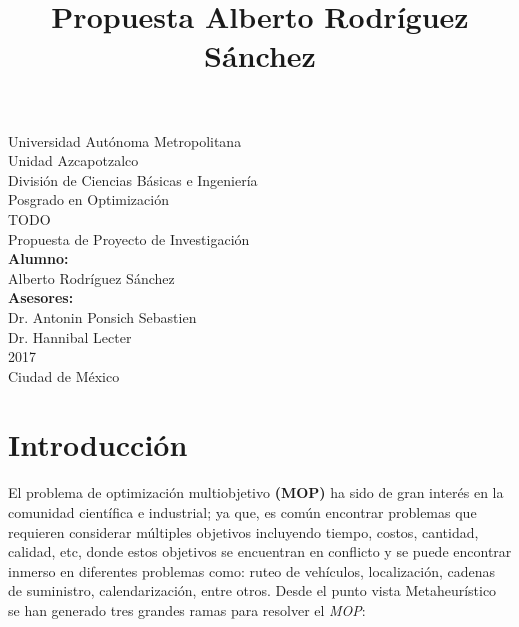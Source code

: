 \documentclass[letterpaper,10pt]{article}
\title{Propuesta Alberto Rodríguez Sánchez}
\begin{document}
\renewcommand{\refname}{Bibliografía}%
\thispagestyle{empty}

\begin{center}
    {\Huge Universidad Autónoma Metropolitana }\\
    {\huge Unidad Azcapotzalco}\\
    \vspace{0.5cm}
    {\Large División de Ciencias Básicas e Ingeniería}\\
    \vspace{1.0cm}
    {\large Posgrado en Optimización}\\
    \vspace{2.0cm}    
    {\Large TODO}\\
    \vspace{1.0cm}
    {\large Propuesta de Proyecto de Investigación}\\
    \vspace{2.0cm}
    {\large\textbf{Alumno:}}\\
    Alberto Rodríguez Sánchez\\
    \vspace{1.5cm}
    \bigskip
    {\large\textbf{Asesores:}}\\
    Dr. Antonin Ponsich Sebastien\\
    Dr. Hannibal Lecter\\
    \vspace{1.5cm}
     2017\\
    \vspace{1.0cm}
    Ciudad de México\\
\end{center}
\newpage
\tableofcontents
\newpage
\section{Introducción}

El problema de optimización multiobjetivo \textbf{(MOP)} ha sido de gran interés en la comunidad científica e industrial; ya que, es común encontrar problemas que requieren considerar múltiples objetivos incluyendo tiempo, costos, cantidad, calidad, etc, donde estos objetivos se encuentran en conflicto y se puede encontrar inmerso en diferentes problemas como: ruteo de vehículos, localización, cadenas de suministro, calendarización, entre otros. Desde el punto vista Metaheurístico se han generado tres grandes ramas para resolver el \emph{MOP}:
\end{document}

